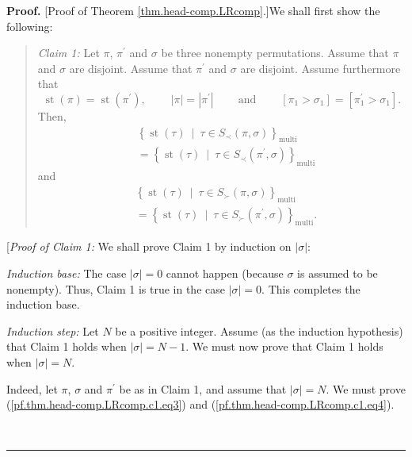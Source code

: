 \documentclass[numbers=enddot,12pt,final,onecolumn,notitlepage]{scrartcl}%
\theoremstyle{definition}
\newenvironment{statement}{\begin{quote}}{\end{quote}}
\newenvironment{proof}[1][Proof]{\noindent\textbf{#1.} }{\ \rule{0.5em}{0.5em}}
\begin{document}
\begin{proof}
[Proof of Theorem \ref{thm.head-comp.LRcomp}.]We shall first show the following:

\begin{statement}
\textit{Claim 1:} Let $\pi$, $\pi^{\prime}$ and $\sigma$ be three nonempty
permutations. Assume that $\pi$ and $\sigma$ are disjoint. Assume that
$\pi^{\prime}$ and $\sigma$ are disjoint. Assume furthermore that%
\[
\operatorname*{st}\left(  \pi\right)  =\operatorname*{st}\left(  \pi^{\prime
}\right)  ,\ \ \ \ \ \ \ \ \ \ \left\vert \pi\right\vert =\left\vert
\pi^{\prime}\right\vert \ \ \ \ \ \ \ \ \ \ \text{and}%
\ \ \ \ \ \ \ \ \ \ \left[  \pi_{1}>\sigma_{1}\right]  =\left[  \pi
_{1}^{\prime}>\sigma_{1}\right]  .
\]
Then,
\begin{align}
&  \left\{  \operatorname*{st}\left(  \tau\right)  \ \mid\ \tau\in S_{\prec
}\left(  \pi,\sigma\right)  \right\}  _{\operatorname*{multi}}\nonumber\\
&  =\left\{  \operatorname*{st}\left(  \tau\right)  \ \mid\ \tau\in S_{\prec
}\left(  \pi^{\prime},\sigma\right)  \right\}  _{\operatorname*{multi}}
\label{pf.thm.head-comp.LRcomp.c1.eq3}%
\end{align}
and%
\begin{align}
&  \left\{  \operatorname*{st}\left(  \tau\right)  \ \mid\ \tau\in S_{\succ
}\left(  \pi,\sigma\right)  \right\}  _{\operatorname*{multi}}\nonumber\\
&  =\left\{  \operatorname*{st}\left(  \tau\right)  \ \mid\ \tau\in S_{\succ
}\left(  \pi^{\prime},\sigma\right)  \right\}  _{\operatorname*{multi}}.
\label{pf.thm.head-comp.LRcomp.c1.eq4}%
\end{align}

\end{statement}

[\textit{Proof of Claim 1:} We shall prove Claim 1 by induction on $\left\vert
\sigma\right\vert $:

\textit{Induction base:} The case $\left\vert \sigma\right\vert =0$ cannot
happen (because $\sigma$ is assumed to be nonempty). Thus, Claim 1 is true in
the case $\left\vert \sigma\right\vert =0$. This completes the induction base.

\textit{Induction step:} Let $N$ be a positive integer. Assume (as the
induction hypothesis) that Claim 1 holds when $\left\vert \sigma\right\vert
=N-1$. We must now prove that Claim 1 holds when $\left\vert \sigma\right\vert
=N$.

Indeed, let $\pi$, $\sigma$ and $\pi^{\prime}$ be as in Claim 1, and assume
that $\left\vert \sigma\right\vert =N$. We must prove
(\ref{pf.thm.head-comp.LRcomp.c1.eq3}) and
(\ref{pf.thm.head-comp.LRcomp.c1.eq4}).


\end{proof}
\end{document}

